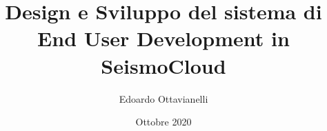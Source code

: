 \documentclass[compress]{beamer}
\author{Edoardo Ottavianelli}
\title{Design e Sviluppo del sistema di End User Development in SeismoCloud}
\institute{Dipartimento di Informatica\\Università La Sapienza - Roma}
\date{Ottobre 2020}
\begin{document}
\begin{frame}[t,plain]
\titlepage

\vspace{15px}

\end{frame}


\end{document}
